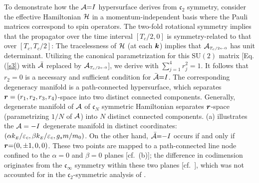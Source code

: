 \documentclass[aps, prb, showpacs, twocolumn, notitlepage, superscriptaddress]{revtex4-1}
\begin{document}
To demonstrate how the ${\cal A}{=}I$ hypersurface derives from $\mathfrak{c}_2$ symmetry, consider  the effective Hamiltonian ${\cal H}$ 
in a momentum-independent basis where the Pauli matrices correspond to spin operators. The two-fold rotational symmetry 
implies that the propagator over the time interval $[T_c/2,0]$ is symmetry-related to that over $[T_c,T_c/2]$:
The tracelessness of ${\cal H}$ (at each $\boldsymbol{k}$) implies that  ${{\cal A}}_{\scriptscriptstyle{T_c/2\leftarrow 0}}$  has unit determinant. 
Utilizing the canonical parametrization for this $\text{SU}(2)$ matrix [Eq. (\ref{s3}) with ${\cal \bar{A}}$ replaced by ${{\cal A}}_{\scriptscriptstyle{T_c/2\leftarrow 0}}$], we derive 
with $\sum_{j=1}^4r_j^2{=}1$. It follows that $r_2{=}0$ is a necessary and sufficient condition for $\bar{{\cal A}}{=}I$. The corresponding degeneracy manifold is a path-connected hypersurface, which separates $\boldsymbol{r}=(r_1,r_2,r_3,r_4)$-space into two distinct connected components. Generally, degenerate manifold of ${\cal A}$ of $\mathfrak{c}_N$ symmetric Hamiltonian separates $\boldsymbol{r}$-space (parametrizing $1/N$ of ${\cal A}$) into $N$ distinct connected components. (a) illustrates the ${\cal A}=-I$ degenerate manifold in distinct coordinates: $(\alpha k_{\scriptscriptstyle{E}}/\varepsilon_c,\beta k_{\scriptscriptstyle{E}}/\varepsilon_c,g_sm/m_0)$. On the other hand, ${\cal \bar{A}}{=}{-}I$ occurs if and only if $\boldsymbol{r}{=}(0,\pm 1,0,0)$. These two points are mapped to a path-connected line node confined to the $\alpha{=}0$ and $\beta{=}0$ planes [cf.\ (b)]; the difference in codimension originates from the  $\mathfrak{c}_{\infty}$ symmetry within these two planes [cf.\ ], which was not accounted for in the $\mathfrak{c}_2$-symmetric analysis of . 

\end{document}
